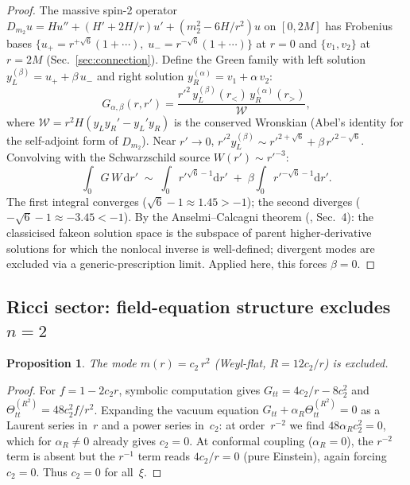 \documentclass[a4paper,12pt]{article}
\newtheorem{proposition}{Proposition}
\newcommand{\dd}{\mathrm{d}}
\begin{document}
\begin{proof}
The massive spin-2 operator $D_{m_2}u=Hu''+(H'+2H/r)u'+(m_2^2-6H/r^2)u$
on $[0,2M]$ has Frobenius bases
$\{u_+=r^{+\sqrt{6}}(1+\cdots),\;u_-=r^{-\sqrt{6}}(1+\cdots)\}$
at $r=0$ and $\{v_1,v_2\}$ at $r=2M$ (Sec.~\ref{sec:connection}).
Define the Green family with left solution
$y_L^{(\beta)}=u_++\beta\,u_-$ and right solution
$y_R^{(\alpha)}=v_1+\alpha\,v_2$:
\[
  G_{\alpha,\beta}(r,r')
  =\frac{r'^2\,y_L^{(\beta)}(r_<)\,y_R^{(\alpha)}(r_>)}
  {\mathcal{W}},
\]
where $\mathcal{W}=r^2H(y_Ly_R'-y_L'y_R)$ is the conserved Wronskian
(Abel's identity for the self-adjoint form of $D_{m_2}$).
Near $r'\to 0$, $r'^2 y_L^{(\beta)}\sim r'^{2+\sqrt{6}}
+\beta\,r'^{2-\sqrt{6}}$.
Convolving with the Schwarzschild source $W(r')\sim r'^{-3}$:
\[
  \int_0 G\,W\,\dd r' \;\sim\;
  \int_0 r'^{\sqrt{6}-1}\dd r'
  \;+\; \beta\!\int_0 r'^{-\sqrt{6}-1}\dd r'.
\]
The first integral converges ($\sqrt{6}-1\approx 1.45>-1$);
the second diverges ($-\sqrt{6}-1\approx -3.45<-1$).
By the Anselmi--Calcagni theorem (\cite{AnselmiCalcagni2025}, Sec.~4):
the classicised fakeon solution space is the subspace of
parent higher-derivative solutions for which the nonlocal inverse
is well-defined; divergent modes are excluded via a
generic-prescription limit.
Applied here, this forces $\beta=0$.
\end{proof}

\subsection{Ricci sector: field-equation structure excludes $n=2$}

\begin{proposition}\label{prop:ricci}
The mode $m(r)=c_2\,r^2$ (Weyl-flat, $R=12c_2/r$) is excluded.
\end{proposition}

\begin{proof}
For $f=1-2c_2 r$, symbolic computation gives
$G_{tt}=4c_2/r-8c_2^2$ and
$\Theta^{(R^2)}_{tt}=48c_2^2 f/r^2$.
Expanding the vacuum equation
$G_{tt}+\alpha_R\Theta^{(R^2)}_{tt}=0$ as a Laurent series in~$r$
and a power series in~$c_2$:
at order~$r^{-2}$ we find $48\alpha_R c_2^2=0$, which for
$\alpha_R\neq 0$ already gives $c_2=0$.
At conformal coupling ($\alpha_R=0$), the $r^{-2}$ term is absent but
the $r^{-1}$ term reads $4c_2/r=0$ (pure Einstein), again forcing $c_2=0$.
Thus $c_2=0$ for all~$\xi$.
\end{proof}

\end{document}
